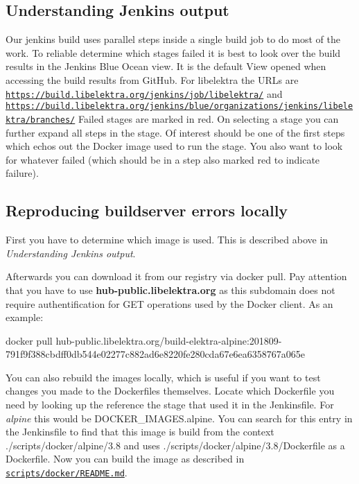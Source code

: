 \subsection*{Understanding Jenkins output}

Our jenkins build uses parallel steps inside a single build job to do most of the work. To reliable determine which stages failed it is best to look over the build results in the Jenkins Blue Ocean view. It is the default View opened when accessing the build results from Git\+Hub. For libelektra the U\+R\+Ls are \href{https://build.libelektra.org/jenkins/job/libelektra/}{\tt https\+://build.\+libelektra.\+org/jenkins/job/libelektra/} and \href{https://build.libelektra.org/jenkins/blue/organizations/jenkins/libelektra/branches/}{\tt https\+://build.\+libelektra.\+org/jenkins/blue/organizations/jenkins/libelektra/branches/} Failed stages are marked in red. On selecting a stage you can further expand all steps in the stage. Of interest should be one of the first steps which echos out the Docker image used to run the stage. You also want to look for whatever failed (which should be in a step also marked red to indicate failure).

\subsection*{Reproducing buildserver errors locally}

First you have to determine which image is used. This is described above in {\itshape Understanding Jenkins output}.

Afterwards you can download it from our registry via {\ttfamily docker pull}. Pay attention that you have to use {\bfseries hub-\/public.\+libelektra.\+org} as this subdomain does not require authentification for G\+ET operations used by the Docker client. As an example\+: 
\begin{DoxyCode}
docker pull
       hub-public.libelektra.org/build-elektra-alpine:201809-791f9f388cbdff0db544e02277c882ad6e8220fe280cda67e6ea6358767a065e
\end{DoxyCode}


You can also rebuild the images locally, which is useful if you want to test changes you made to the Dockerfiles themselves. Locate which Dockerfile you need by looking up the reference the stage that used it in the Jenkinsfile. For {\itshape alpine} this would be {\ttfamily D\+O\+C\+K\+E\+R\+\_\+\+I\+M\+A\+G\+E\+S.\+alpine}. You can search for this entry in the Jenkinsfile to find that this image is build from the context {\ttfamily ./scripts/docker/alpine/3.8} and uses {\ttfamily ./scripts/docker/alpine/3.8/\+Dockerfile} as a Dockerfile. Now you can build the image as described in \href{https://master.libelektra.org/scripts/docker/README.md#building-images-locally}{\tt scripts/docker/\+R\+E\+A\+D\+M\+E.\+md}.


